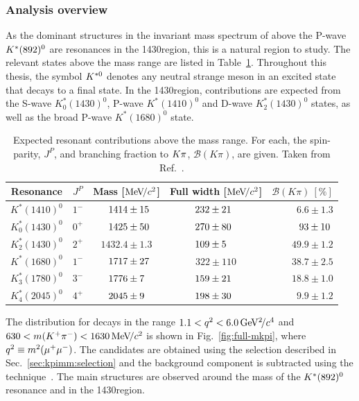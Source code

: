 \subsubsection{Analysis overview}

As the dominant structures in the \kpi invariant mass spectrum of \BdToKpimm above the P-wave ${{K}^*}(892)^{0}$ are resonances in the 1430\mevcc region, this is a natural region to study. The relevant \Kstarz states above the \KstP mass range are listed in Table~\ref{tab:introduction:states}. Throughout this thesis, the symbol ${{K}^{*0}}$ denotes any neutral strange meson in an excited state that decays to a \Kp\pim final state. In the 1430\mevcc region, contributions are expected from the S-wave $K^\ast_0(1430)^0$, P-wave $K^\ast(1410)^0$ and D-wave $K^\ast_2(1430)^0$ states, as well as the broad P-wave $K^\ast(1680)^0$ state. 

\begin{table}[!tb]
\caption{Expected resonant contributions above the \KstP mass range. For each, the spin-parity, $J^P$, and branching fraction to ${K}{\pi}$, $\mathcal{B}(K\pi)$, are given. Taken from Ref.~\cite{lu-wang}.}
\label{tab:introduction:states}
\centering
\begin{tabular}{c|c|c|c|r}
    Resonance & $J^{P}$ & Mass [$\mathrm{Me\kern -0.1em V\!/}c^2$] & Full width [$\mathrm{Me\kern -0.1em V\!/}c^2$]  & $\mathcal{B}(K\pi)~[\%]$ \\
   \hline
   $K^\ast(1410)^0$ & $1^{-}$& $\hphantom{0.}1414 \pm 15\hphantom{.}$& $232 \pm 21\hphantom{0}$  & $6.6 \pm 1.3$ \\
   $K^\ast_0(1430)^0$ & $0^{+}$ & $\hphantom{0.}1425 \pm 50\hphantom{.}$ & $270 \pm 80\hphantom{0}$ & $\hphantom{.}93 \pm 10\hphantom{.}$ \\
   $K^\ast_2(1430)^0$ & $2^{+}$ & $1432.4\pm 1.3$ & $109 \pm 5\hphantom{00}$ & $49.9 \pm 1.2$ \\
   $K^\ast(1680)^0$ & $1^{-}$ & $\hphantom{0.}1717 \pm 27\hphantom{.}$ & $322 \pm 110$ & $38.7 \pm 2.5$ \\
   $K^\ast_3(1780)^0$ & $3^{-}$ & $\hphantom{0.}1776 \pm 7\hphantom{0.}$ & $159 \pm 21\hphantom{0}$ & $18.8 \pm 1.0$ \\
   $K^\ast_4(2045)^0$ & $4^{+}$ & $\hphantom{0.}2045 \pm 9\hphantom{0.}$ & $198 \pm 30\hphantom{0}$ & $9.9 \pm 1.2$ \\
 \end{tabular}
 \end{table}

The \mkpi distribution for \BdToKpimm decays in the range $1.1<{q^2}<6.0{\mathrm{\,Ge\kern -0.1em V^2\!/}c^4}$ and $630<m({{K}^+}{{\pi}^-})<1630{\mathrm{\,Me\kern -0.1em V\!/}c^2}$ is shown in Fig.~\ref{fig:full-mkpi}, where ${q^2} \equiv m^2({\mu^+} {\mu^-})$. The candidates are obtained using the selection described in Sec.~\ref{sec:kpimm:selection} and the background component is subtracted using the \sPlot technique~\cite{splot}. The main structures are observed around the mass of the ${{K}^*}(892)^{0}$ resonance and in the 1430\mevcc region. 

